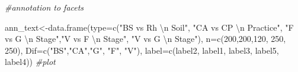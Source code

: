 \documentclass[]{interact}
\theoremstyle{plain}%
\theoremstyle{definition}
\theoremstyle{remark}
\newenvironment{Shaded}{\begin{snugshade}}{\end{snugshade}}
\newcommand{\AttributeTok}[1]{\textcolor[rgb]{0.77,0.63,0.00}{#1}}
\newcommand{\CommentTok}[1]{\textcolor[rgb]{0.56,0.35,0.01}{\textit{#1}}}
\newcommand{\DecValTok}[1]{\textcolor[rgb]{0.00,0.00,0.81}{#1}}
\newcommand{\FunctionTok}[1]{\textcolor[rgb]{0.00,0.00,0.00}{#1}}
\newcommand{\NormalTok}[1]{#1}
\newcommand{\OtherTok}[1]{\textcolor[rgb]{0.56,0.35,0.01}{#1}}
\newcommand{\SpecialCharTok}[1]{\textcolor[rgb]{0.00,0.00,0.00}{#1}}
\newcommand{\StringTok}[1]{\textcolor[rgb]{0.31,0.60,0.02}{#1}}
\begin{document}
\begin{Shaded}
\begin{Highlighting}[]
\CommentTok{\#annotation to facets}

\NormalTok{ann\_text}\OtherTok{\textless{}{-}}\FunctionTok{data.frame}\NormalTok{(}\AttributeTok{type=}\FunctionTok{c}\NormalTok{(}\StringTok{"BS vs Rh }\SpecialCharTok{\textbackslash{}n}\StringTok{  Soil"}\NormalTok{, }\StringTok{"CA vs CP }\SpecialCharTok{\textbackslash{}n}\StringTok{ Practice"}\NormalTok{,}
                            \StringTok{"F vs G }\SpecialCharTok{\textbackslash{}n}\StringTok{ Stage"}\NormalTok{,}\StringTok{"V vs F }\SpecialCharTok{\textbackslash{}n}\StringTok{  Stage"}\NormalTok{, }\StringTok{"V vs G }\SpecialCharTok{\textbackslash{}n}\StringTok{  Stage"}\NormalTok{),}
                     \AttributeTok{n=}\FunctionTok{c}\NormalTok{(}\DecValTok{200}\NormalTok{,}\DecValTok{200}\NormalTok{,}\DecValTok{120}\NormalTok{, }\DecValTok{250}\NormalTok{, }\DecValTok{250}\NormalTok{),}
                     \AttributeTok{Dif=}\FunctionTok{c}\NormalTok{(}\StringTok{"BS"}\NormalTok{,}\StringTok{"CA"}\NormalTok{,}\StringTok{"G"}\NormalTok{, }\StringTok{"F"}\NormalTok{, }\StringTok{"V"}\NormalTok{),}
                     \AttributeTok{label=}\FunctionTok{c}\NormalTok{(label2, label1, label3, label5, label4))}
\CommentTok{\#plot}


\end{Highlighting}
\end{Shaded}
\end{document}
